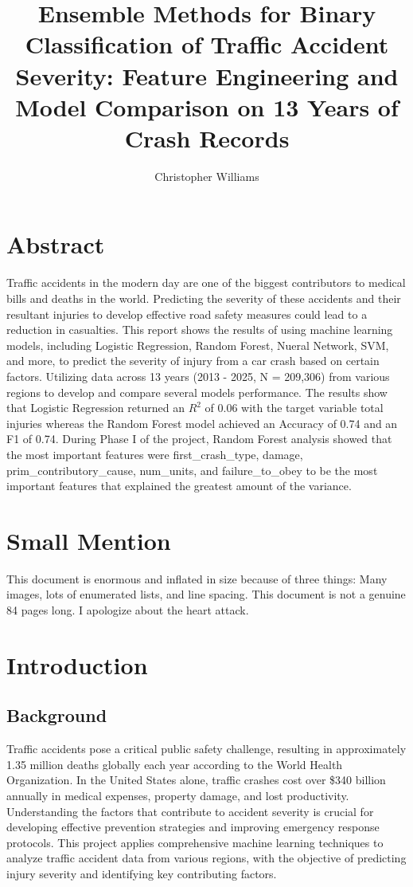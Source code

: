 \documentclass[stu,12pt,floatsintext]{apa7}
\title{Ensemble Methods for Binary Classification of Traffic Accident Severity: 
Feature Engineering and Model Comparison on 13 Years of Crash Records}
\author{Christopher Williams}
\begin{document}
\maketitle

\tableofcontents
\listoffigures
\listoftables

\section{Abstract}

Traffic accidents in the modern day are one of the biggest contributors to medical bills and deaths in the world. Predicting 
the severity of these accidents and their resultant injuries to develop effective road safety measures could lead to a reduction in
casualties. This report shows the results of using machine learning models, including Logistic Regression, Random Forest, Nueral Network,
SVM, and more, to predict the severity of injury from a car crash based on certain factors. Utilizing data across 13 years (2013 - 2025, N = 209,306)
from various regions to develop and compare several models performance. The results show that Logistic Regression returned an $R^2$ of 0.06 
with the target variable total injuries whereas the Random Forest model achieved an Accuracy of 0.74 and an F1 of 0.74. During Phase I of the
project, Random Forest analysis showed that the most important features were first\_crash\_type, damage, prim\_contributory\_cause, num\_units, and 
failure\_to\_obey to be the most important features that explained the greatest amount of the variance. 

\section{Small Mention}

This document is enormous and inflated in size because of three things: Many images, lots of enumerated lists, and line spacing. This document is 
not a genuine 84 pages long. I apologize about the heart attack.

\section{Introduction}

\subsection{Background}

Traffic accidents pose a critical public safety challenge, resulting in approximately 1.35 million deaths globally each year according to the World Health Organization. 
In the United States alone, traffic crashes cost over \$340 billion annually in medical expenses, property damage, and lost productivity. 
Understanding the factors that contribute to accident severity is crucial for developing effective prevention strategies and improving emergency response protocols. 
This project applies comprehensive machine learning techniques to analyze traffic accident data from various regions, with the objective of predicting 
injury severity and identifying key contributing factors.
\end{document}
